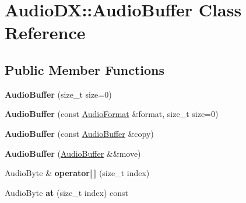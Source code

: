\hypertarget{class_audio_d_x_1_1_audio_buffer}{\section{Audio\-D\-X\-:\-:Audio\-Buffer Class Reference}
\label{class_audio_d_x_1_1_audio_buffer}
}
\subsection*{Public Member Functions}
\begin{DoxyCompactItemize}
\item 
\hypertarget{class_audio_d_x_1_1_audio_buffer_ad881f1b3acc535b34cb8e02410e0aa67}{{\bfseries Audio\-Buffer} (size\-\_\-t size=0)}\label{class_audio_d_x_1_1_audio_buffer_ad881f1b3acc535b34cb8e02410e0aa67}

\item 
\hypertarget{class_audio_d_x_1_1_audio_buffer_aa9fb168b51ca03c7859a8bd46b571d4b}{{\bfseries Audio\-Buffer} (const \hyperlink{struct_audio_d_x_1_1_audio_format}{Audio\-Format} \&format, size\-\_\-t size=0)}\label{class_audio_d_x_1_1_audio_buffer_aa9fb168b51ca03c7859a8bd46b571d4b}

\item 
\hypertarget{class_audio_d_x_1_1_audio_buffer_ae82f470a6950b3b3b2603c336f5481a1}{{\bfseries Audio\-Buffer} (const \hyperlink{class_audio_d_x_1_1_audio_buffer}{Audio\-Buffer} \&copy)}\label{class_audio_d_x_1_1_audio_buffer_ae82f470a6950b3b3b2603c336f5481a1}

\item 
\hypertarget{class_audio_d_x_1_1_audio_buffer_a2d347abef411f9f7eeb6934de1b1446f}{{\bfseries Audio\-Buffer} (\hyperlink{class_audio_d_x_1_1_audio_buffer}{Audio\-Buffer} \&\&move)}\label{class_audio_d_x_1_1_audio_buffer_a2d347abef411f9f7eeb6934de1b1446f}

\item 
\hypertarget{class_audio_d_x_1_1_audio_buffer_adb09d1b7b7cf023746f655970d044cce}{Audio\-Byte \& {\bfseries operator\mbox{[}$\,$\mbox{]}} (size\-\_\-t index)}\label{class_audio_d_x_1_1_audio_buffer_adb09d1b7b7cf023746f655970d044cce}

\item 
\hypertarget{class_audio_d_x_1_1_audio_buffer_aa792363b3591aa54e707de3798c22ef3}{Audio\-Byte {\bfseries at} (size\-\_\-t index) const }\label{class_audio_d_x_1_1_audio_buffer_aa792363b3591aa54e707de3798c22ef3}


\end{DoxyCompactItemize}
